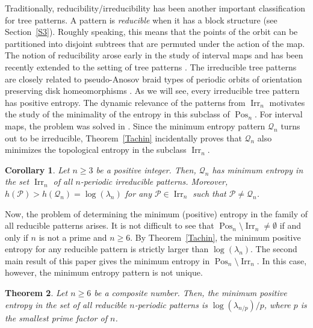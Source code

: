 \documentclass[a4paper]{amsart}
\newtheorem{MainTheorem}{Theorem}
\newtheorem{MainCorollary}[MainTheorem]{Corollary}
\theoremstyle{definition}
\DeclareMathOperator{\Pos}{Pos}
\DeclareMathOperator{\Irr}{Irr}
\begin{document}
Traditionally, reducibility/irreducibility has been another important classification for tree patterns.
A pattern is \emph{reducible} when it has a block structure (see Section~\ref{S3}). Roughly speaking, this
means that the points of the orbit can be partitioned into disjoint subtrees that are permuted under the action
of the map. The notion of reducibility arose early in the study of interval maps and
has been recently extended to the setting of tree patterns \cite{reducibility}. The irreducible tree patterns
are closely related to pseudo-Anosov braid types of periodic orbits of orientation preserving disk homeomorphisms
\cite{fm}. As we will see, every irreducible tree pattern has positive entropy. The dynamic relevance
of the patterns from $\Irr_n$ motivates the study of the minimality of the entropy in this subclass of
$\Pos_n$. For interval maps, the problem was solved in \cite{minor}. Since the minimum entropy pattern
$\mathcal{Q}_n$ turns out to be irreducible, Theorem~\ref{Tachin} incidentally proves that
$\mathcal{Q}_n$ also minimizes the topological entropy in the subclass $\Irr_n$.

\begin{MainCorollary}\label{Tachin2}
Let $n\ge3$ be a positive integer. Then, $\mathcal{Q}_n$ has minimum entropy in the set $\Irr_n$
of all $n$-periodic irreducible patterns. Moreover, $h(\mathcal{P}) > h(\mathcal{Q}_n)=\log(\lambda_n)$ for any
$\mathcal{P}\in\Irr_n$ such that $\mathcal{P}\ne\mathcal{Q}_n$.
\end{MainCorollary}

Now, the problem of determining the
minimum (positive) entropy in the family of all reducible patterns arises. It is not difficult to see that
$\Pos_n\setminus\Irr_n\ne\emptyset$ if and only if $n$ is not a prime and $n\ge6$. By Theorem~\ref{Tachin},
the minimum positive entropy for any reducible pattern is strictly larger than $\log(\lambda_n)$. The
second main result of this paper gives the minimum entropy in $\Pos_n\setminus\Irr_n$.
In this case, however, the minimum entropy pattern is not unique.

\begin{MainTheorem}\label{Tachin3}
Let $n\ge6$ be a composite number. Then, the minimum positive entropy in the set of all reducible $n$-periodic
patterns is $\log(\lambda_{n/p})/p$, where $p$ is the smallest prime factor of $n$.
\end{MainTheorem}
\end{document}

